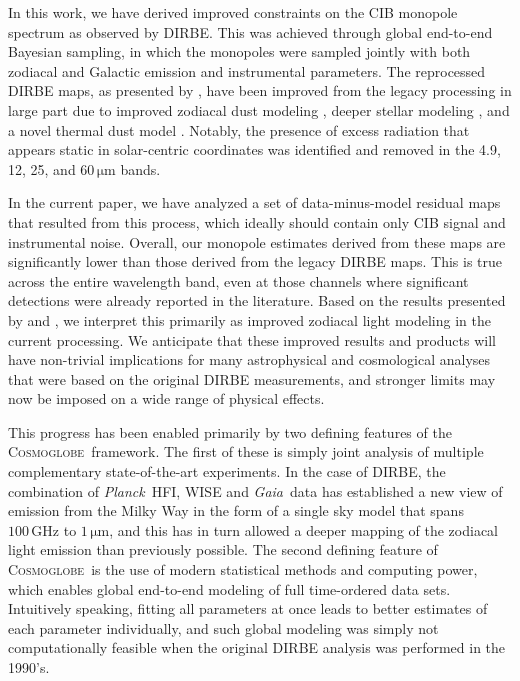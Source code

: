 \documentclass{aa}
\def\Planck{\textit{Planck}}
\def\Gaia{\textit{Gaia}}
\newcommand{\cosmoglobe}{\textsc{Cosmoglobe}}
\def\Planck{\textit{Planck}}
\def\Gaia{\textit{Gaia}}
\begin{document}
In this work, we have derived improved constraints on the CIB monopole spectrum as observed by DIRBE. This was achieved through global end-to-end Bayesian sampling, in which the monopoles were sampled jointly with both zodiacal and Galactic emission and instrumental parameters. The reprocessed DIRBE maps, as presented by \citet{CG02_01}, have been improved from the legacy processing in large part due to improved zodiacal dust modeling \citep{CG02_02}, deeper stellar modeling \citep{CG02_04}, and a novel thermal dust model \citep{CG02_05,CG02_06,CG02_07}. Notably, the presence of excess radiation that appears static in solar-centric coordinates was identified and removed in the 4.9, 12, 25, and $60\,\mathrm{\mu m}$ bands.


In the current paper, we have analyzed a set of data-minus-model residual maps that resulted from this process, which ideally should contain only CIB signal and instrumental noise. Overall, our monopole estimates derived from these maps are significantly lower than those derived from the legacy DIRBE maps. This is true across the entire wavelength band, even at those channels where significant detections were already reported in the literature. Based on the results presented by \citet{CG02_01} and \citet{CG02_02}, we interpret this primarily as improved zodiacal light modeling in the current processing. We anticipate that these improved results and products will have non-trivial implications for many astrophysical and cosmological analyses that were based on the original DIRBE measurements, and stronger limits may now be imposed on a wide range of physical effects.

This progress has been enabled primarily by two defining features of the \cosmoglobe\ framework. The first of these is simply joint analysis of multiple complementary state-of-the-art experiments. In the case of DIRBE, the combination of \Planck\ HFI, WISE and \Gaia\ data has established a new view of emission from the Milky Way in the form of a single sky model that spans $100\,\mathrm{GHz}$ to $1\,\mathrm{\mu m}$, and this has in turn allowed a deeper mapping of the zodiacal light emission than previously possible. The second defining feature of \cosmoglobe\ is the use of modern statistical methods and computing power, which enables global end-to-end modeling of full time-ordered data sets. Intuitively speaking, fitting all parameters at once leads to better estimates of each parameter individually, and such global modeling was simply not computationally feasible when the original DIRBE analysis was performed in the 1990's.
\end{document}
